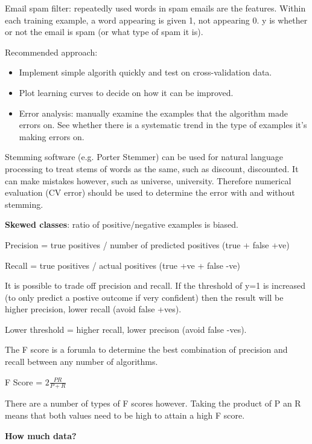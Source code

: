 \documentclass[12pt] {article}
\begin{document}
{    Email spam filter: repeatedly used words in spam emails are the features.
    Within each training example, a word appearing is given 1, not appearing 0.
    y is whether or not the email is spam (or what type of spam it is).

    Recommended approach:
    \vspace{-1em}
    \begin{itemize}
      \item Implement simple algorith quickly and test on cross-validation data.
      \item Plot learning curves to decide on how it can be improved.
      \item Error analysis: manually examine the examples that the algorithm
            made errors on. See whether there is a systematic trend in the type
            of examples it's making errors on. 
    \end{itemize}

    Stemming software (e.g. Porter Stemmer) can be used for natural language
    processing to treat stems of words as the same, such as discount, 
    discounted. It can make mistakes however, such as universe, university.
    Therefore numerical evaluation (CV error) should be used to determine
    the error with and without stemming. 

    \textbf{Skewed classes}: ratio of positive/negative examples is biased.

    Precision = true positives / number of predicted positives (true + false
    +ve)

    Recall = true positives / actual positives (true +ve + false -ve)

    It is possible to trade off precision and recall. If the threshold of
    y=1 is increased (to only predict a postive outcome if very confident)
    then the result will be higher precision, lower recall (avoid false
    +ves). 

    Lower threshold = higher recall, lower precison (avoid false -ves).

    The F score is a forumla to determine the best combination of precision 
    and recall between any number of algorithms.

    F Score = $2\frac{PR}{P+R}$

    There are a number of types of F scores however. Taking the product of 
    P an R means that both values need to be high to attain a high F score.

    \textbf{How much data?}
    
}
\end{document}
